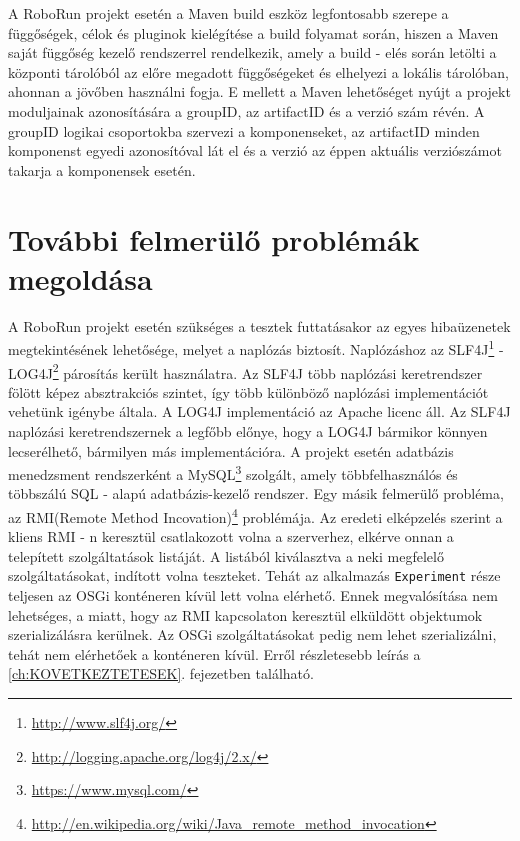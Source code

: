 	A RoboRun projekt esetén a Maven build eszköz legfontosabb szerepe a függőségek, célok és pluginok kielégítése a build folyamat során, hiszen a Maven saját függőség kezelő rendszerrel rendelkezik, amely  a build - elés során letölti a központi tárolóból az előre megadott függőségeket és elhelyezi a lokális tárolóban, ahonnan a jövőben használni fogja. E mellett a Maven lehetőséget nyújt a projekt moduljainak azonosítására a groupID, az artifactID és a verzió szám révén. A groupID logikai csoportokba szervezi a komponenseket, az artifactID minden komponenst egyedi azonosítóval lát el és a verzió az éppen aktuális verziószámot takarja a komponensek esetén.



\section{További felmerülő problémák megoldása}\label{sec:TovábbiProblemak}

	A RoboRun projekt esetén szükséges a tesztek futtatásakor az egyes hibaüzenetek megtekintésének lehetősége, melyet a naplózás biztosít. Naplózáshoz az SLF4J\footnote{\href {http://www.slf4j.org/}{http://www.slf4j.org/}} - LOG4J\footnote{\href {http://logging.apache.org/log4j/2.x/}{http://logging.apache.org/log4j/2.x/}} párosítás került használatra. Az SLF4J több naplózási keretrendszer fölött képez absztrakciós szintet, így több különböző naplózási implementációt vehetünk igénybe általa. A LOG4J implementáció az Apache licenc áll. Az SLF4J naplózási keretrendszernek a legfőbb előnye, hogy a LOG4J bármikor könnyen lecserélhető, bármilyen más implementációra. 
	A projekt esetén adatbázis menedzsment rendszerként a MySQL\footnote{\href {https://www.mysql.com/}{https://www.mysql.com/}} szolgált, amely többfelhasználós és többszálú SQL - alapú adatbázis-kezelő rendszer. 
	Egy másik felmerülő probléma, az RMI(Remote Method Incovation)\footnote{\href {http://en.wikipedia.org/wiki/Java\_remote\_method\_invocation}{http://en.wikipedia.org/wiki/Java\_remote\_method\_invocation}} problémája. Az eredeti elképzelés szerint a kliens RMI - n keresztül csatlakozott volna a szerverhez, elkérve onnan a telepített szolgáltatások listáját. A listából kiválasztva a neki megfelelő szolgáltatásokat, indított volna teszteket. Tehát az alkalmazás \texttt{Experiment} része teljesen az OSGi konténeren kívül lett volna elérhető. Ennek megvalósítása nem lehetséges, a miatt, hogy az RMI kapcsolaton keresztül elküldött objektumok szerializálásra kerülnek. Az OSGi szolgáltatásokat pedig nem lehet szerializálni, tehát nem elérhetőek a konténeren kívül. Erről részletesebb leírás a \ref{ch:KOVETKEZTETESEK}. fejezetben található.
	
	